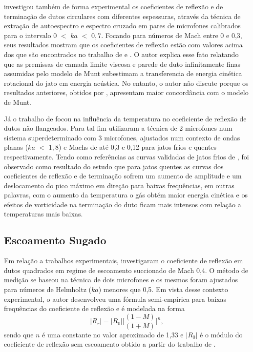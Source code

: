  investigou também de forma experimental os coeficientes de reflexão e de terminação de dutos circulares com diferentes espessuras, através da técnica de extração de autoespectro e espectro cruzado em pares de microfones calibrados para o intervalo $0$ $<$ $ka$ $<$ $0,7$. Focando para números de Mach entre 0 e 0,3, seus resultados mostram que os coeficientes de reflexão estão com valores acima dos que são encontrados no trabalho de  e . O autor explica esse fato relatando que as premissas de camada limite viscosa e parede de duto infinitamente finas assumidas pelo modelo de Munt subestimam a transferencia de energia cinética rotacional do jato em energia acústica. No entanto, o autor não discute porque os resultados anteriores, obtidos por , apresentam maior concordância com o modelo de Munt. 


Já o trabalho de  focou na influência da temperatura no coeficiente de reflexão de dutos não flangeados. Para tal fim utilizaram a técnica de 2 microfones num sistema superdeterminado com 3 microfones, ajustados num contexto de ondas planas ($ka$ $<$ $1,8$) e Machs de até 0,3 e 0,12 para jatos frios e quentes respectivamente. Tendo como referências as curvas validadas de jatos frios de , foi observado como resultado do estudo que para jatos quentes as curvas dos coeficientes de reflexão e de terminação sofrem um aumento de amplitude e um deslocamento do pico máximo em direção para baixas frequências, em outras palavras, com o aumento da temperatura o gás obtém maior energia cinética e os efeitos de vorticidade na terminação do duto ficam mais intensos com relação a temperaturas mais baixas.



\subsection{Escoamento Sugado}

Em relação a trabalhos experimentais,  investigaram o coeficiente de reflexão em dutos quadrados em regime de escoamento succionado de Mach 0,4. O método de medição se baseou na técnica de dois microfones e os mesmos foram ajustados para números de Helmholtz ($ka$) menores que 0,5. Em vista desse contexto experimental, o autor desenvolveu uma fórmula semi-empírica para baixas frequências do coeficiente de reflexão e é modelada na forma
\begin{equation}
        |R_{r}| = |R_{0}|\bigg[\frac{(1 - M)}{(1 + M)}\bigg]^{n},
    \label{eq:R_r_ingard}
\end{equation}
sendo que $n$ é uma constante no valor aproximado de 1,33 e $|R_{0}|$ é o módulo do coeficiente de reflexão sem escoamento obtido a partir do trabalho de . 

